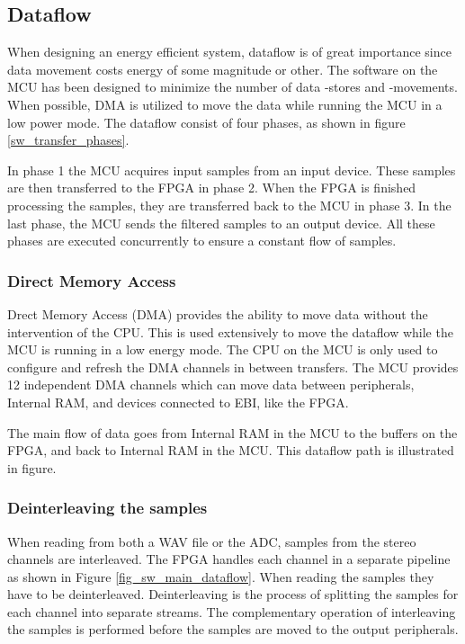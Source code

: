 
\subsection{Dataflow}

When designing an energy efficient system, dataflow is of great importance since
data movement costs energy of some magnitude or other. The software on the MCU
has been designed to minimize the number of data -stores and -movements. When
possible, DMA is utilized to move the data while running the MCU in a low power
mode. The dataflow consist of four phases, as shown in figure
\ref{sw_transfer_phases}.

In phase 1 the MCU acquires input samples from an input device. These samples
are then transferred to the FPGA in phase 2. When the FPGA is finished
processing the samples, they are transferred back to the MCU in phase 3. In the
last phase, the MCU sends the filtered samples to an output device. All these
phases are executed concurrently to ensure a constant flow of samples.



\subsubsection{Direct Memory Access}

Drect Memory Access (DMA) provides the ability to move data without the
intervention of the CPU. This is used extensively to move the dataflow while the
MCU is running in a low energy mode. The CPU on the MCU is only used to
configure and refresh the DMA channels in between transfers. The MCU provides 12
independent DMA channels which can move data between peripherals, Internal RAM,
and devices connected to EBI, like the FPGA.

The main flow of data goes from Internal RAM in the MCU to the buffers on the
FPGA, and back to Internal RAM in the MCU. This dataflow path is illustrated in
figure.

% 

\subsubsection{Deinterleaving the samples}

When reading from both a WAV file or the ADC, samples from the stereo channels
are interleaved. The FPGA handles each channel in a separate pipeline as shown
in Figure \ref{fig_sw_main_dataflow}. When reading the samples they have to be
deinterleaved. Deinterleaving is the process of splitting the samples for each
channel into separate streams. The complementary operation of interleaving the
samples is performed before the samples are moved to the output peripherals.

